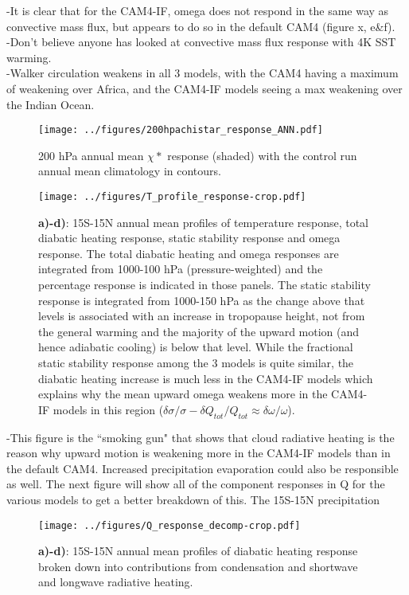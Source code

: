 \documentclass[letterpaper,12pt,titlepage,oneside,final]{book}
\begin{document}
-It is clear that for the CAM4-IF, omega does not respond in the same way as convective mass flux, but appears to do so in the default CAM4 (figure x, e\&f).
\\
-Don't believe anyone has looked at convective mass flux response with 4K SST warming.
\\
-Walker circulation weakens in all 3 models, with the CAM4 having a maximum of weakening over Africa, and the CAM4-IF models seeing a max weakening over the Indian Ocean. 
\begin{figure}[H]
\centering
\noindent\texttt{[image: ../figures/200hpachistar\_response\_ANN.pdf]}\hfill
\caption{200 hPa annual mean $\chi*$ response (shaded) with the control run annual mean climatology in contours.}
\end{figure}

\begin{figure}[H]
\centering
\noindent\texttt{[image: ../figures/T\_profile\_response-crop.pdf]}\hfill
\caption{\textbf{a)-d)}: 15S-15N annual mean profiles of temperature response, total diabatic heating response, static stability response and omega response. The total diabatic heating and omega responses are integrated from 1000-100 hPa (pressure-weighted) and the percentage response is indicated in those panels. The static stability response is integrated from 1000-150 hPa as the change above that levels is associated with an increase in tropopause height, not from the general warming and the majority of the upward motion (and hence adiabatic cooling) is below that level. While the fractional static stability response among the 3 models is quite similar, the diabatic heating increase is much less in the CAM4-IF models which explains why the mean upward omega weakens more in the CAM4-IF models in this region ($\delta{\sigma}/\sigma - \delta{Q_{tot}}/Q_{tot} \approx \delta{\omega}/\omega$).}

\end{figure}
-This figure is the ``smoking gun" that shows that cloud radiative heating is the reason why upward motion is weakening more in the CAM4-IF models than in the default CAM4. Increased precipitation evaporation could also be responsible as well. The next figure will show all of the component responses in Q for the various models to get a better breakdown of this. The 15S-15N precipitation  
\begin{figure}[H]
\centering
\noindent\texttt{[image: ../figures/Q\_response\_decomp-crop.pdf]}\hfill
\caption{\textbf{a)-d)}: 15S-15N annual mean profiles of diabatic heating response broken down into contributions from condensation and shortwave and longwave radiative heating.}

\end{figure}
\end{document}
